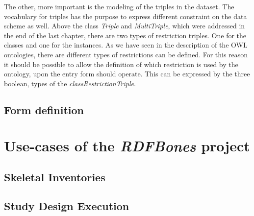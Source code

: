 

The other, more important is the modeling of the triples in the dataset. The vocabulary for triples has the purpose to express different constraint on the data scheme as well. Above the class \textit{Triple} and \textit{MultiTriple}, which were addressed in the end of the last chapter, there are two types of restriction triples. One for the classes and one for the instances. As we have seen in the description of the OWL ontologies, there are different types of restrictions can be defined. For this reason it should be possible to allow the definition of which restriction is used by the ontology, upon the entry form should operate. This can be expressed by the three boolean, types of the \textit{classRestrictionTriple}.





\subsection{Form definition}





\section{Use-cases of the \textit{RDFBones} project}

\subsection{Skeletal Inventories}

\subsection{Study Design Execution}
